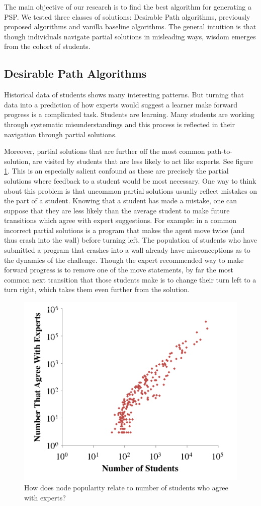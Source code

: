 The main objective of our research is to find the best algorithm for generating a PSP. We tested three classes of solutions: Desirable Path algorithms, previously proposed algorithms and vanilla baseline algorithms. The general intuition is that though individuals navigate partial solutions in misleading ways, wisdom emerges from the cohort of students.

\subsection{Desirable Path Algorithms}

Historical data of students shows many interesting patterns.
But turning that data into a prediction of how experts would suggest a learner make forward progress is a complicated task. Students are learning. Many students are working through systematic misunderstandings and this process is reflected in their navigation through partial solutions. 



Moreover, partial solutions that are further off the most common path-to-solution, are visited by students that are less likely to act like experts. See figure \ref{fig:confidence}. This is an especially salient confound as these are precisely the partial solutions where feedback to a student would be most necessary. One way to think about this problem is that uncommon partial solutions usually reflect mistakes on the part of a student. Knowing that a student has made a mistake, one can suppose that they are less likely than the average student to make future transitions which agree with expert suggestions. For example: in \Pa    a common incorrect partial solutions is a program that makes the agent move twice (and thus crash into the wall) before turning left. The population of students who have submitted a program that crashes into a wall already have misconceptions as to the dynamics of the challenge. Though the expert recommended way to make forward progress is to remove one of the move statements, by far the most common next transition that those students make is to change their turn left to a turn right, which takes them even further from the solution.


\begin{figure}
\centering
\includegraphics[width=0.5\columnwidth]{img/wrongVsPopularity.png}
\caption[Partial solution popularity vs probability of optimal progress]{How does node popularity relate to number of students who agree with experts?}
\label{fig:confidence}
\end{figure}


